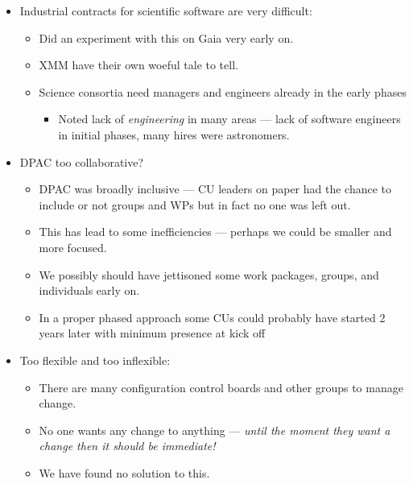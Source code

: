 {\begin{itemize}
\begin{itemize}
      \item Perhaps ESA should have taken control of all critical software.
      \item ESA is stepping back from this type of role in future missions and was not
        totally happy about the level of involvement of ESAC in DPAC.
    \end{itemize}
  \item Industrial contracts for scientific software are very difficult:
    \begin{itemize}
      \item Did an experiment with this on Gaia very early on.
      \item XMM have their own woeful tale to tell.
	\item Science consortia need managers and engineers already in the early phases
    \begin{itemize}
	
        \item  Noted lack of {\em engineering} in many areas ---
          {\color{red} lack of software engineers in initial phases, many hires were astronomers}.
    \end{itemize}

    \end{itemize}



\item DPAC too collaborative? 
  \begin{itemize}
    \item DPAC was broadly inclusive --- CU leaders on paper had the chance to include or not groups
      and WPs but in fact no one was left out.
    \item This has lead to some inefficiencies --- perhaps we could be smaller and more focused.
    \item We possibly should have jettisoned some work packages, groups, and individuals early on.
    \item {\color{blue} In a proper phased approach some CUs could probably have started 2 years
    later with minimum presence at kick off} 
  \end{itemize}
\item Too flexible and too inflexible:
  \begin{itemize}
    \item There are many configuration control boards and other groups to manage change.
    \item {\color{blue}No one wants any change to anything --- {\em until the moment they want a change  then it
      should be immediate!}}
    \item {\color{red} We have found no solution to this.} 
  \end{itemize}
\end{itemize}
}





